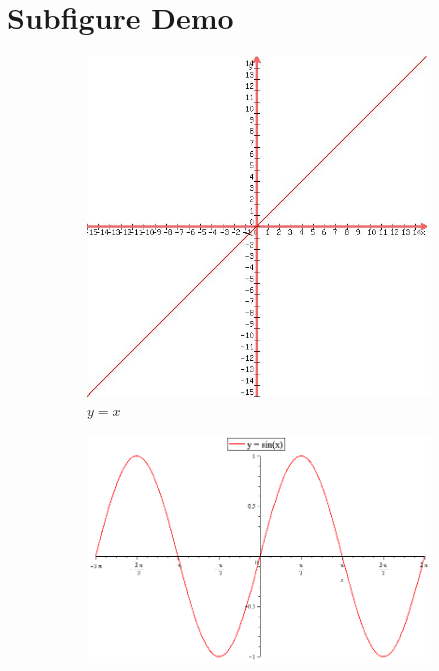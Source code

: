 \documentclass[10pt,a4paper]{article}
\begin{document}
\section*{Subfigure Demo} 
\begin{figure}[h]
 \centering
 \begin{subfigure}[b]{0.3\textwidth}
 \centering
 \includegraphics[width=\textwidth]{y=x.jpg} 
 \caption{$y=x$}
 \label{fig:y equals x}
 \end{subfigure}
 \hfill
 \begin{subfigure}[b]{0.3\textwidth}
 \centering
 \includegraphics[width=\textwidth]{y=3sinx.jpg}

\end{subfigure}
\end{figure}
\end{document}
